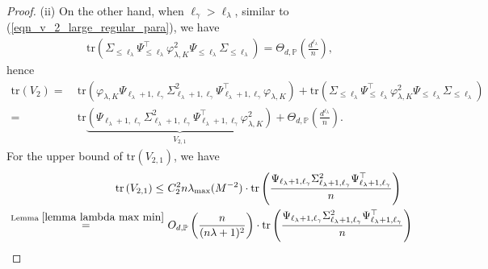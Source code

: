 \documentclass{article}
\theoremstyle{plain}
\theoremstyle{definition}
\theoremstyle{remark}
\newcommand{\green}{\color{green}}
\begin{document}
\begin{appendix}
\begin{proof}

\noindent (ii) On the other hand, when ${\ell_{\gamma}} > \ell_{\lambda}$, similar to (\ref{eqn_v_2_large_regular_para}), we have
\begin{equation*}
    \begin{aligned}
        \mathrm{tr} \left( \Sigma_{\leq \ell_{\lambda}} \Psi_{\leq \ell_{\lambda}}^{\top}  \varphi_{\lambda, K}^2 \Psi_{\leq \ell_{\lambda}} \Sigma_{\leq \ell_{\lambda}} \right)
        =
        \Theta_{d, \mathbb{P}}\left(\frac{d^{\ell_{\lambda}}}{n}\right),
    \end{aligned}
\end{equation*}
hence
\begin{equation*}
    \begin{aligned}
    \mathrm{tr} \left( V_{2} \right)
        =&~
        \mathrm{tr} \left( \varphi_{\lambda, K} \Psi_{\ell_{\lambda}+1, \ell_{\gamma}} \Sigma_{\ell_{\lambda}+1, \ell_{\gamma}}^{2} \Psi_{\ell_{\lambda}+1, \ell_{\gamma}}^{\top} \varphi_{\lambda, K} \right)
        +
        \mathrm{tr} \left( \Sigma_{\leq \ell_{\lambda}} \Psi_{\leq \ell_{\lambda}}^{\top}  \varphi_{\lambda, K}^2 \Psi_{\leq \ell_{\lambda}} \Sigma_{\leq \ell_{\lambda}} \right)\\
        =&~
        \mathrm{tr} \underbrace{\left(  \Psi_{\ell_{\lambda}+1, \ell_{\gamma}} \Sigma_{\ell_{\lambda}+1, \ell_{\gamma}}^{2} \Psi_{\ell_{\lambda}+1, \ell_{\gamma}}^{\top} \varphi_{\lambda, K}^2 \right)}_{V_{2, 1}}
        +
        \Theta_{d, \mathbb{P}}\left(\frac{d^{\ell_{\lambda}}}{n}\right).
    \end{aligned}
\end{equation*}
For the upper bound of $\mathrm{tr}(V_{2, 1})$, we have
\begin{equation*}
    \begin{aligned}
        \mathrm{tr} \left( V_{2, 1} \right) 
        \leq &~
        C_2^2 n\lambda_{\text{max}}(M^{-2})
        \cdot \mathrm{tr} \left( \frac{\Psi_{\ell_{\lambda}+1, \ell_{\gamma}} \Sigma_{\ell_{\lambda}+1, \ell_{\gamma}}^{2} \Psi_{\ell_{\lambda}+1, \ell_{\gamma}}^{\top}}{n} \right)\\
        \overset{\text{ Lemma } \ref{lemma lambda max min}}{=} &~
        O_{d, \mathbb{P}}\left(\frac{n}{(n\lambda+1)^2}\right) \cdot \mathrm{tr} \left( \frac{\Psi_{\ell_{\lambda}+1, \ell_{\gamma}} \Sigma_{\ell_{\lambda}+1, \ell_{\gamma}}^{2} \Psi_{\ell_{\lambda}+1, \ell_{\gamma}}^{\top}}{n} \right)\\

\end{aligned}
\end{equation*}
\end{proof}
\end{appendix}
\end{document}
